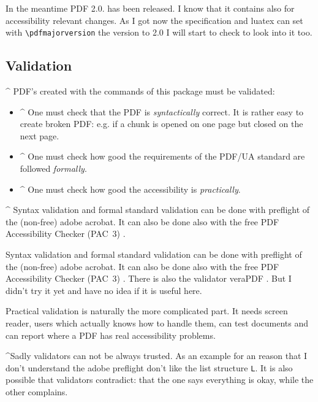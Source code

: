 \documentclass[DIV=12,parskip=half-,bibliography=totoc]{scrartcl}
\newcommand\PDF{PDF}
\begin{document}
\TagP In the meantime \PDF{} 2.0. has been released. I know that it contains also for accessibility relevant changes. As I got now the specification and luatex can set with \verb+\pdfmajorversion+ the version to 2.0 I will start to check to look into it too.%
\TagPend

\subsection{Validation}

\TagP^ \PDF{}'s created with the commands of this package must be validated:\TagPend


\begin{itemize}
\item
\TagP^ One must check that the \PDF{} is \emph{syntactically} correct. It is rather easy to create broken \PDF{}: e.g. if a chunk is opened on one page but closed on the next page.
    \Pmeti
\item
\TagP^ One must check how good the requirements of the PDF/UA standard are followed \emph{formally}.
    \Pmeti
\item
\TagP^ One must check how good the accessibility is \emph{practically}.\Pmeti
\end{itemize}

\TagP^
Syntax validation and formal standard validation can be done with preflight of the (non-free) adobe acrobat.
It can also be done also with the free \PDF{} Accessibility Checker (PAC~3) \parencite{pac3}.

\TagP
Syntax validation and formal standard validation can be done with preflight of the (non-free) adobe acrobat.
It can also be done also with the free \PDF{} Accessibility Checker (PAC~3) \parencite{pac3}.
There is also the validator veraPDF \parencite{verapdf}. But I didn't try it yet and have no idea if it is useful here.

\TagP Practical validation is naturally the more complicated part. It needs screen reader, users which actually knows how to handle them, can test documents and can report where a \PDF{} has real accessibility problems.\TagPend




\TagP^Sadly validators can not be always trusted. As an example for an reason that I don't understand the adobe preflight don't like the list structure \texttt{L}.
It is also possible that validators contradict: that the one says everything is okay, while the other complains.\TagPend
\end{document}
